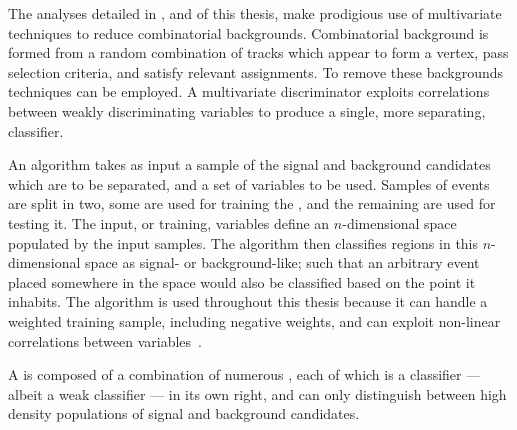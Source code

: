 The analyses detailed in ,  and  of this thesis, make
prodigious use of multivariate techniques to reduce combinatorial backgrounds.
Combinatorial background is formed from a random combination of tracks which appear to form a
vertex, pass selection criteria, and satisfy relevant \pid assignments.
To remove these backgrounds \MVA techniques can be employed.
A multivariate discriminator exploits correlations between weakly discriminating variables to
produce a single, more separating, classifier.

An \MVA algorithm takes as input a sample of the signal and background candidates which are to be
separated, and a set of variables to be used.
Samples of events are split in two, some are used for training the \MVA, and the remaining are used
for testing it.
The input, or training, variables define an $n$-dimensional space populated by the input samples.
The algorithm then classifies regions in this $n$-dimensional space as signal- or background-like;
such that an arbitrary event placed somewhere in the space would also be classified based on the
point it inhabits.
The \BDT algorithm is used throughout this thesis because it can handle
a weighted training sample, including negative weights, and can exploit non-linear correlations
between variables~\cite{Breiman,Roe}.

A \BDT is composed of a combination of numerous \DTs, each of which is a classifier
--- albeit a weak classifier ---
in its own right, and can only distinguish between high density populations of signal and
background candidates.

